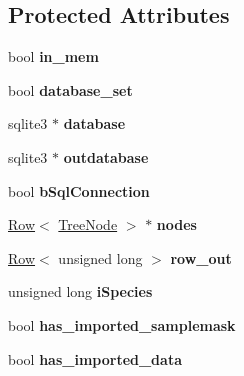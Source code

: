 \subsection*{Protected Attributes}
\begin{DoxyCompactItemize}
\item 
bool {\bfseries in\+\_\+mem}\hypertarget{class_community_abc144eeba19574b6b46df384a61acc6f}{}\label{class_community_abc144eeba19574b6b46df384a61acc6f}

\item 
bool {\bfseries database\+\_\+set}\hypertarget{class_community_a7e00bcb1c5a24280346df94853e2919b}{}\label{class_community_a7e00bcb1c5a24280346df94853e2919b}

\item 
sqlite3 $\ast$ {\bfseries database}\hypertarget{class_community_a382c0e6e90ca8055d3192bfe2af4d741}{}\label{class_community_a382c0e6e90ca8055d3192bfe2af4d741}

\item 
sqlite3 $\ast$ {\bfseries outdatabase}\hypertarget{class_community_a884634e98e0aacb082968664acd5a32e}{}\label{class_community_a884634e98e0aacb082968664acd5a32e}

\item 
bool {\bfseries b\+Sql\+Connection}\hypertarget{class_community_aa9fe335ff9e94c626d1e0d41ff145524}{}\label{class_community_aa9fe335ff9e94c626d1e0d41ff145524}

\item 
\hyperlink{class_row}{Row}$<$ \hyperlink{class_tree_node}{Tree\+Node} $>$ $\ast$ {\bfseries nodes}\hypertarget{class_community_aa1309616989642b98c15e6e2ed25b379}{}\label{class_community_aa1309616989642b98c15e6e2ed25b379}

\item 
\hyperlink{class_row}{Row}$<$ unsigned long $>$ {\bfseries row\+\_\+out}\hypertarget{class_community_a06e5a133792f29fa17a1b0664d650541}{}\label{class_community_a06e5a133792f29fa17a1b0664d650541}

\item 
unsigned long {\bfseries i\+Species}\hypertarget{class_community_a094f10ce5bbbcab19bccda352f545aad}{}\label{class_community_a094f10ce5bbbcab19bccda352f545aad}

\item 
bool {\bfseries has\+\_\+imported\+\_\+samplemask}\hypertarget{class_community_a6c3c70184f586330635a4123699f586f}{}\label{class_community_a6c3c70184f586330635a4123699f586f}

\item 
bool {\bfseries has\+\_\+imported\+\_\+data}\hypertarget{class_community_a0371c39658281c8956c29c6b2d564b79}{}\label{class_community_a0371c39658281c8956c29c6b2d564b79}


\end{DoxyCompactItemize}
